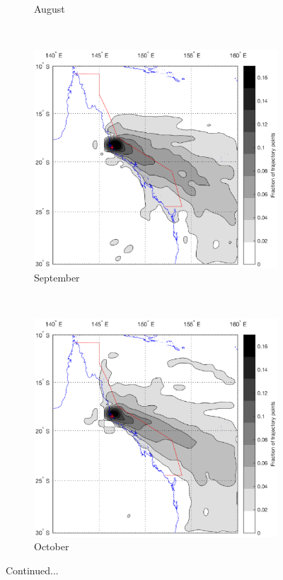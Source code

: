 \begin{figure}[!t]
\begin{subfigure}[b]{0.45\textwidth}
	    \caption{August}
	    \label{subfig:cair}
    \end{subfigure}
    \\
    \begin{subfigure}[b]{0.45\textwidth}
	    \includegraphics[width=\textwidth]{Fig/Research/BT_Coast/Map_095.eps}
	    \caption{September}
	    \label{subfig:cair}
    \end{subfigure}
    ~
    \begin{subfigure}[b]{0.45\textwidth}
	    \includegraphics[width=\textwidth]{Fig/Research/BT_Coast/Map_105.eps}
	    \caption{October}
	    \label{subfig:cair}
    \end{subfigure}
    \caption{Continued...}
    \label{fig:btcoastlucjet}
\end{figure}

